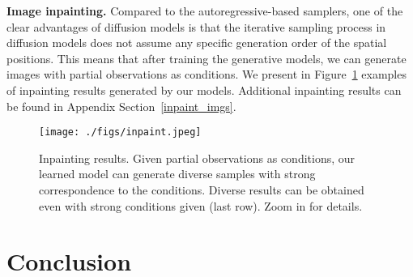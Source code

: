 \documentclass[10pt,twocolumn,letterpaper]{article}
\begin{document}
\begin{table}[t]
    \caption{Performance (FID / Recall) with different values of $\lambda$ and prediction targets. All results are obtained on the LSUN Churches experiments. }
    \label{tab:ablation}
    \centering
    \small
\end{table}

\noindent \textbf{Image inpainting.}
Compared to the autoregressive-based samplers, one of the clear advantages of diffusion models is that the iterative sampling process in diffusion models does not assume any specific generation order of the spatial positions. This means that after training the generative models, we can generate images with partial observations as conditions. We present in Figure~\ref{fig:inpaint} examples of inpainting results generated by our models. Additional inpainting results can be found in Appendix Section~\ref{inpaint_imgs}.

\begin{figure}[]
    \centering
	\texttt{[image: ./figs/inpaint.jpeg]}
\caption{Inpainting results. Given partial observations as conditions, our learned model can generate diverse samples with strong correspondence to the conditions. Diverse results can be obtained even with strong conditions given (last row). Zoom in for details.}
\label{fig:inpaint}
\end{figure}





\section{Conclusion}
\label{conclusion}
\end{document}
